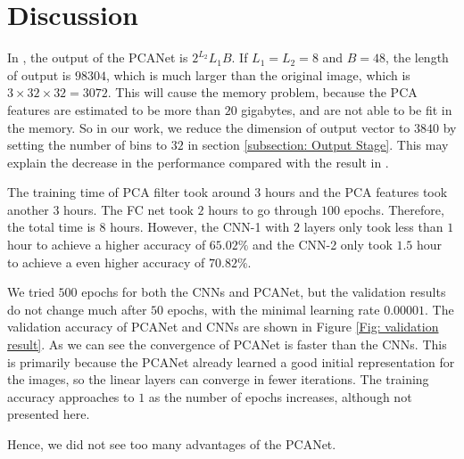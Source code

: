 \documentclass{article} %
\begin{document}
%


\section{Discussion}
In \cite{chan2015pcanet}, the output of the PCANet is $2^{L_2}L_1B$. If $L_1=L_2=8$ and $B=48$, the length of output is $98304$, which is much larger than the original image, which is $3\times 32 \times 32=3072$. This will cause the memory problem, because the PCA features are estimated to be more than $20$ gigabytes, and are not able to be fit in the memory. So in our work, we reduce the dimension of output vector to $3840$ by setting the number of bins to $32$ in section \ref{subsection: Output Stage}. This may explain the decrease in the performance compared with the result in \cite{chan2015pcanet}. 

The training time of PCA filter took around $3$ hours and the PCA features took another $3$ hours. The FC net took $2$ hours to go through $100$ epochs. Therefore, the total time is $8$ hours. However, the CNN-1 with $2$ layers only took less than $1$ hour to achieve a higher accuracy of $65.02\%$ and the CNN-2 only took $1.5$ hour to achieve a even higher accuracy of $70.82\%$.

We tried $500$ epochs for both the CNNs and PCANet, but the validation results do not change much after $50$ epochs, with the minimal learning rate $0.00001$. The validation accuracy of PCANet and CNNs are shown in Figure \ref{Fig: validation result}. As we can see the convergence of PCANet is faster than the CNNs. This is primarily because the PCANet already learned a good initial representation for the images, so the linear layers can converge in fewer iterations. The training accuracy approaches to $1$ as the number of epochs increases, although not presented here. 

Hence, we did not see too many advantages of the PCANet.
\end{document}
